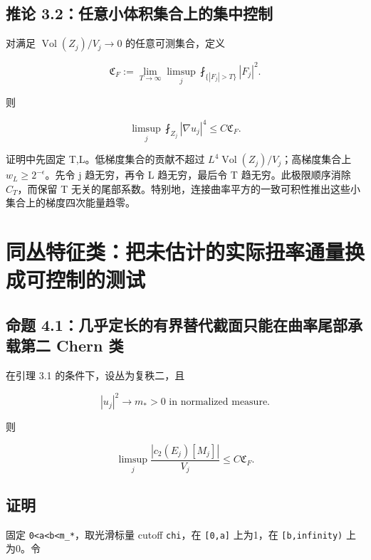 \documentclass[UTF8,11pt,fontset=none]{ctexart}
\begin{document}
\subsection{推论 3.2：任意小体积集合上的集中控制}\label{ch2:ux63a8ux8bba-3.2ux4efbux610fux5c0fux4f53ux79efux96c6ux5408ux4e0aux7684ux96c6ux4e2dux63a7ux5236}

对满足 \(\operatorname{Vol}(Z_j)/V_j\to0\) 的任意可测集合，定义

\[
 \mathfrak C_F:=\lim_{T\to\infty}\limsup_j
 \fint_{\{|F_j|>T\}}|F_j|^2.
\]

则

\[
 \boxed{
 \limsup_j\fint_{Z_j}|\nabla u_j|^4\le C\mathfrak C_F.}
 \tag{2.17}\label{eq:r2:17}
\]

证明中先固定 T,L。低梯度集合的贡献不超过 \(L^4\operatorname{Vol}(Z_j)/V_j\)；高梯度集合上 \(w_L\ge2^{-\epsilon}\)。先令 j 趋无穷，再令 L 趋无穷，最后令 T 趋无穷。此极限顺序消除 \(C_T\)，而保留 T 无关的尾部系数。特别地，连接曲率平方的一致可积性推出这些小集合上的梯度四次能量趋零。

\section{同丛特征类：把未估计的实际扭率通量换成可控制的测试}\label{ch2:ux540cux4e1bux7279ux5f81ux7c7bux628aux672aux4f30ux8ba1ux7684ux5b9eux9645ux626dux7387ux901aux91cfux6362ux6210ux53efux63a7ux5236ux7684ux6d4bux8bd5}

\subsection{命题 4.1：几乎定长的有界替代截面只能在曲率尾部承载第二 Chern 类}\label{ch2:ux547dux9898-4.1ux51e0ux4e4eux5b9aux957fux7684ux6709ux754cux66ffux4ee3ux622aux9762ux53eaux80fdux5728ux66f2ux7387ux5c3eux90e8ux627fux8f7dux7b2cux4e8c-chern-ux7c7b}

在引理 3.1 的条件下，设丛为复秩二，且

\[
 |u_j|^2\longrightarrow m_*>0\text{ in normalized measure}.
\]

则

\[
 \boxed{
 \limsup_j\frac{|c_2(E_j)[M_j]|}{V_j}
 \le C\mathfrak C_F.}
 \tag{2.18}\label{eq:r2:18}
\]

\subsection{证明}\label{ch2:ux8bc1ux660e-2}

固定 \texttt{0\textless{}a\textless{}b\textless{}m\_*}，取光滑标量 cutoff \texttt{chi}，在 \texttt{{[}0,a{]}} 上为1，在 \texttt{{[}b,infinity)} 上为0。令
\end{document}
